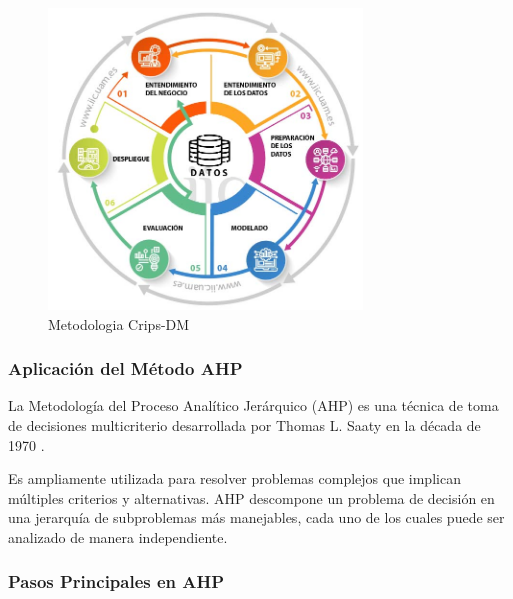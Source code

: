 \documentclass[
  11pt,
  bookmarksnumbered]{article}
\begin{document}
\begin{figure}

{\centering \includegraphics[width=3.28in]{media 2/image1} 

}

\caption{Metodologia Crips-DM}\label{fig:unnamed-chunk-4}
\end{figure}

\hypertarget{aplicaciuxf3n-del-muxe9todo-ahp}{%
\subsubsection{Aplicación del Método AHP}\label{aplicaciuxf3n-del-muxe9todo-ahp}}

La Metodología del Proceso Analítico Jerárquico (AHP) es una técnica de toma de decisiones multicriterio desarrollada por Thomas L. Saaty en la década de 1970 \textcite{saaty1980analytic}.

Es ampliamente utilizada para resolver problemas complejos que implican múltiples criterios y alternativas.
AHP descompone un problema de decisión en una jerarquía de subproblemas más manejables, cada uno de los cuales puede ser analizado de manera independiente.

\hypertarget{pasos-principales-en-ahp}{%
\subsubsection{Pasos Principales en AHP}\label{pasos-principales-en-ahp}}
\end{document}
